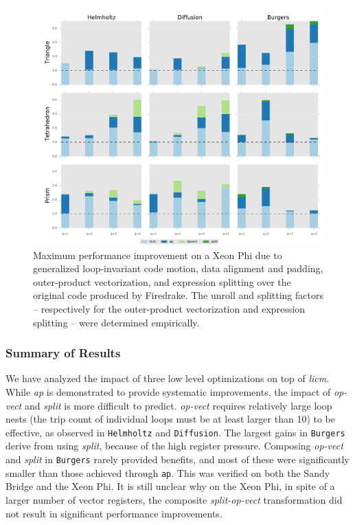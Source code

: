 \begin{figure}[t]
\centerline{\includegraphics[scale=0.45]{lowlevelopt/perf-results/individual/plot_phi}}
\caption{Maximum performance improvement on a Xeon Phi due to generalized loop-invariant code motion, data alignment and padding, outer-product vectorization, and expression splitting over the original code produced by Firedrake. The unroll and splitting factors -- respectively for the outer-product vectorization and expression splitting -- were determined empirically.}
\label{fig:coffee-individual-res-phi}
\end{figure}


\subsubsection{Summary of Results}
We have analyzed the impact of three low level optimizations on top of {\em licm}. While {\em ap} is demonstrated to provide systematic improvements, the impact of {\em op-vect} and {\em split} is more difficult to predict. {\em op-vect} requires relatively large loop nests (the trip count of individual loops must be at least larger than 10) to be effective, as observed in {\tt Helmholtz} and {\tt Diffusion}. The largest gains in {\tt Burgers} derive from using {\em split}, because of the high register pressure. Composing {\em op-vect} and {\em split} in {\tt Burgers} rarely provided benefits, and most of these were significantly smaller than those achieved through {\tt ap}. This was verified on both the Sandy Bridge and the Xeon Phi. It is still unclear why on the Xeon Phi, in spite of a larger number of vector registers, the composite {\em split-op-vect} transformation did not result in significant performance improvements.

